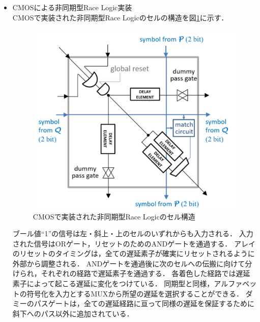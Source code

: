 \begin{itemize}
ブール値“1”の信号は左・斜上・上のセルのいずれからも入力される．
入力された信号はORゲートを通過して、飽和アップカウンタにおいてNクロックサイクルに0をカウントする．この飽和アップカウンタをクロックと同期させる．
これにより，1つのセルを通過し，右・下のセルへと伝搬する際に1クロックサイクルを要する．
各着色ゲートの出力は，所望の重量に達した時点でトリガーする特定の重量を表しており，アルファベットの符号化を入力とするMUXから所望の重量を選択することができる．
生成される出力信号がパルスではなく固定ブール値“1”であることを確実にするために，到着回路のセットが配置され，各計算の最後にリセットされている．

図\ref{fig:CMOSsync}のセルを繰り返した構造を持つアレイに信号が入力された時から出力信号を得るまでのクロック数をカウントするカウンタがアレイ外部に存在する．
このカウンタが計測した値が最短経路をパスした時のクロック数となる．

\item CMOSによる非同期型Race Logic実装\\
CMOSで実装された非同期型Race Logicのセルの構造を図\ref{fig:CMOSasync}に示す．
\begin{figure}[t!]
\begin{center}
\includegraphics[keepaspectratio,scale=0.2]{fig/2/CMOSasync.png}
\caption{CMOSで実装された非同期型Race Logicのセル構造\cite{madhavan20174}}
\label{fig:CMOSasync}
\end{center}
\end{figure}

ブール値“1”の信号は左・斜上・上のセルのいずれからも入力される．
入力された信号はORゲート，リセットのためのANDゲートを通過する．
アレイのリセットのタイミングは，全ての遅延素子が確実にリセットされるように外部から調整される．
ANDゲートを通過後に次のセルへの伝搬に向けて分けられ，それぞれの経路で遅延素子を通過する．
各着色した経路では遅延素子によって起こる遅延に変化をつけている．
同期型と同様，アルファベットの符号化を入力とするMUXから所望の遅延を選択することができる．
ダミーのパスゲートは，全ての遅延経路に亘って同様の遅延を保証するために斜下へのパス以外に追加されている．


\end{itemize}
